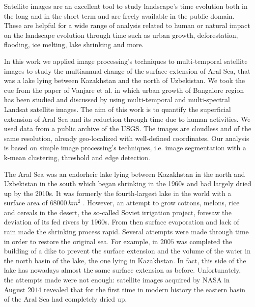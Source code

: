 Satellite images are an excellent tool to study landscape's time evolution both in the long and in the short term and are freely available in the public domain. 
These are helpful for a wide range of analysis related to human or natural impact on the landscape evolution through time such as urban growth, deforestation, flooding, ice melting, lake shrinking and more.

In this work we applied image processing's techniques to multi-temporal satellite images to study the multiannual change of the surface extension of Aral Sea, that was a lake lying between Kazakhstan and the north of Uzbekistan. 
We took the cue from the paper of Vanjare et al. \cite{satelliteImg} in which urban growth of Bangalore region has been studied and discussed by using multi-temporal and multi-spectral Landsat satellite images. 
The aim of this work is to quantify the superficial extension of Aral Sea and its reduction through time due to human activities.
We used data from a public archive of the USGS. 
The images are cloudless and of the same resolution, already geo-localized with well-defined coordinates. 
Our analysis is based on simple image processing's techniques, i.e. image segmentation with a k-mean clustering, threshold and edge detection.

The Aral Sea was an endorheic lake lying between Kazakhstan in the north and Uzbekistan in the south which began shrinking in the 1960s and had largely dried up by the 2010s. 
It was formerly the fourth-largest lake in the world with a surface area of $68000\,km^2$ \cite{aralSea}.  
However, an attempt to grow cottons, melons, rice and cereals in the desert, the so-called Soviet irrigation project, foresaw the deviation of its fed rivers by 1960s. 
From then surface evaporation and lack of rain made the shrinking process rapid. Several attempts were made through time in order to restore the original sea.
For example, in $2005$ was completed the building of a dike to prevent the surface extension and the volume of the water in the north basin of the lake, the one lying in Kazakhstan. 
In fact, this side of the lake has nowadays almost the same surface extension as before. 
Unfortunately, the attempts made were not enough: satellite images acquired by NASA in August $2014$ revealed that for the first time in modern history the eastern basin of the Aral Sea had completely dried up.
